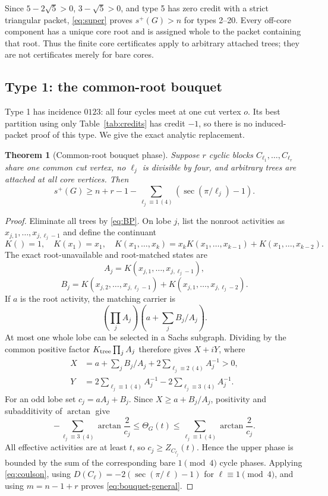 \documentclass[11pt]{article}
\newtheorem{theorem}{Theorem}[section]
\theoremstyle{remark}
\begin{document}
Since $5-2\sqrt5>0$, $3-\sqrt5>0$, and type 5 has zero credit with a strict
triangular packet, \eqref{eq:super} proves $s^+(G)>n$ for types 2--20.  Every
off-core component has a unique core root and is assigned whole to the packet
containing that root.  Thus the finite core certificates apply to arbitrary
attached trees; they are not certificates merely for bare cores.

\subsection{Type 1: the common-root bouquet}

Type 1 has incidence $0123$: all four cycles meet at one cut vertex $o$.  Its
best partition using only Table~\ref{tab:credits} has credit $-1$, so there is
no induced-packet proof of this type.  We give the exact analytic replacement.

\begin{theorem}[Common-root bouquet phase]\label{thm:bouquet}
Suppose $r$ cyclic blocks $C_{\ell_1},\ldots,C_{\ell_r}$ share one common cut
vertex, no $\ell_j$ is divisible by four, and arbitrary trees are attached at
all core vertices.  Then
\begin{equation}\label{eq:bouquet-general}
 s^+(G)\geq n+r-1-
 \sum_{\ell_j\equiv1\ (4)}\left(\sec(\pi/\ell_j)-1\right).
\end{equation}
\end{theorem}

\begin{proof}
Eliminate all trees by \eqref{eq:BP}.  On lobe $j$, list the nonroot
activities as $x_{j,1},\ldots,x_{j,\ell_j-1}$ and define the continuant
\[
 K()=1,\quad K(x_1)=x_1,\quad
 K(x_1,\ldots,x_k)=x_kK(x_1,\ldots,x_{k-1})+K(x_1,\ldots,x_{k-2}).
\]
The exact root-unavailable and root-matched states are
\[
 A_j=K(x_{j,1},\ldots,x_{j,\ell_j-1}),
\]
\[
 B_j=K(x_{j,2},\ldots,x_{j,\ell_j-1})
 +K(x_{j,1},\ldots,x_{j,\ell_j-2}).
\]
If $a$ is the root activity, the matching carrier is
\[
 (\prod_jA_j)\left(a+\sum_jB_j/A_j\right).
\]
At most one whole lobe can be selected in a Sachs subgraph.  Dividing by the
common positive factor $K_{\rm tree}\prod_jA_j$ therefore gives $X+iY$, where
\begin{align*}
 X&=a+\sum_jB_j/A_j+2\sum_{\ell_j\equiv2\ (4)}A_j^{-1}>0,\\
 Y&=2\sum_{\ell_j\equiv1\ (4)}A_j^{-1}
    -2\sum_{\ell_j\equiv3\ (4)}A_j^{-1}.
\end{align*}
For an odd lobe set $c_j=aA_j+B_j$.  Since $X\geq a+B_j/A_j$, positivity and
subadditivity of $\arctan$ give
\[
 -\sum_{\ell_j\equiv3\ (4)}\arctan\frac2{c_j}
 \leq\Theta_G(t)\leq
 \sum_{\ell_j\equiv1\ (4)}\arctan\frac2{c_j}.
\]
All effective activities are at least $t$, so
$c_j\geq Z_{C_{\ell_j}}(t)$.  Hence the upper phase is bounded by the sum of
the corresponding bare $1\pmod4$ cycle phases.  Applying
\eqref{eq:coulson}, using
$D(C_\ell)=-2(\sec(\pi/\ell)-1)$ for $\ell\equiv1\pmod4$, and using
$m=n-1+r$ proves \eqref{eq:bouquet-general}.
\end{proof}
\end{document}
